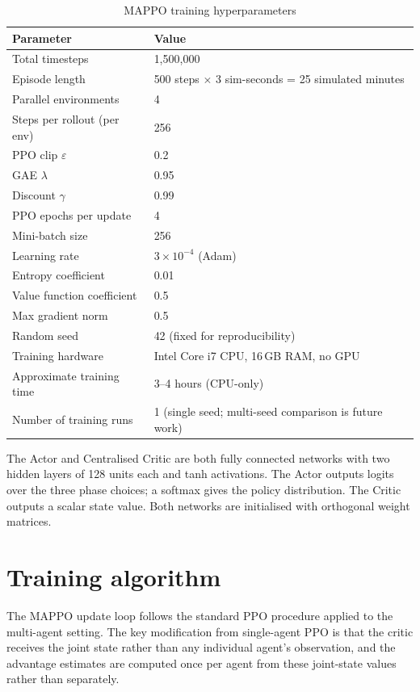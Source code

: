 ﻿\documentclass[11pt, a4paper]{report}
\begin{document}
\begin{table}[H]
\centering
\caption{MAPPO training hyperparameters}
\label{tab:hyperparams}
\begin{tabular}{ll}
\toprule
\textbf{Parameter} & \textbf{Value} \\
\midrule
Total timesteps & 1,500,000 \\
Episode length & 500 steps $\times$ 3 sim-seconds = 25 simulated minutes \\
Parallel environments & 4 \\
Steps per rollout (per env) & 256 \\
PPO clip $\varepsilon$ & 0.2 \\
GAE $\lambda$ & 0.95 \\
Discount $\gamma$ & 0.99 \\
PPO epochs per update & 4 \\
Mini-batch size & 256 \\
Learning rate & $3 \times 10^{-4}$ (Adam) \\
Entropy coefficient & 0.01 \\
Value function coefficient & 0.5 \\
Max gradient norm & 0.5 \\
Random seed & 42 (fixed for reproducibility) \\
Training hardware & Intel Core i7 CPU, 16\,GB RAM, no GPU \\
Approximate training time & 3--4 hours (CPU-only) \\
Number of training runs & 1 (single seed; multi-seed comparison is future work) \\
\bottomrule
\end{tabular}
\end{table}

The Actor and Centralised Critic are both fully connected networks with two hidden layers of 128 units each and tanh activations. The Actor outputs logits over the three phase choices; a softmax gives the policy distribution. The Critic outputs a scalar state value. Both networks are initialised with orthogonal weight matrices.

\section{Training algorithm}

The MAPPO update loop follows the standard PPO procedure applied to the multi-agent setting. The key modification from single-agent PPO is that the critic receives the joint state rather than any individual agent's observation, and the advantage estimates are computed once per agent from these joint-state values rather than separately.
\end{document}
